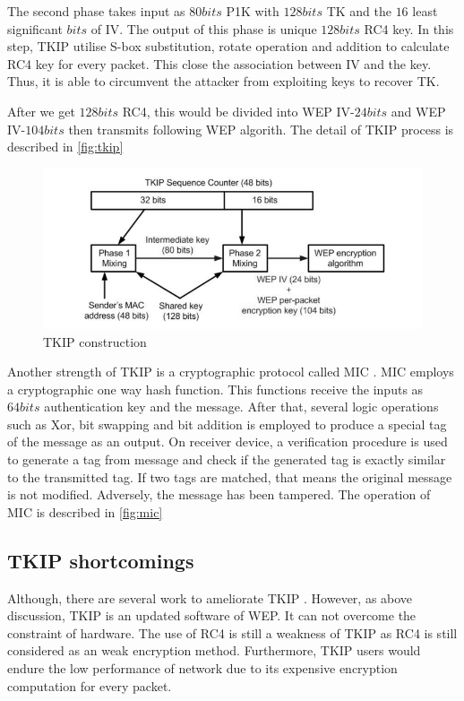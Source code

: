 The second phase takes input as $80 bits$ \ac{P1K} with $128 bits$ \ac{TK} and the $16$ least significant $bits$ of \ac{IV}. The output of this phase is unique $128 bits$ \ac{RC4} key. In this step, \ac{TKIP} utilise S-box substitution, rotate operation and addition to calculate \ac{RC4} key for every packet. This close the association between \ac{IV} and the key. Thus, it is able to circumvent the attacker from exploiting  keys to recover \ac{TK}.

After we get $128 bits$ \ac{RC4}, this would be divided into \ac{WEP} \ac{IV}-$24 bits$ and \ac{WEP} \ac{IV}-$104 bits$ then transmits following \ac{WEP} algorith. The detail of \ac{TKIP} process is described in \autoref{fig:tkip} %

\begin{figure}
	\includegraphics[scale=0.45]{images/tkip.png}
	\caption{\ac{TKIP} construction}
	\label{fig:tkip}
\end{figure}

Another strength of \ac{TKIP} is a cryptographic protocol called \ac{MIC} \cite{1318903}. \ac{MIC} employs a cryptographic one way hash function. This functions receive the inputs as $64 bits$ authentication key and the message. After that, several logic operations such as \ac{Xor}, bit swapping and bit addition is employed to produce a special tag of the message as an output. On receiver device, a verification procedure is used to generate a tag from message and check if the generated tag is exactly similar to the transmitted tag. If two tags are matched, that means the original message is not modified. Adversely, the message has been tampered. The operation of \ac{MIC} is described in \autoref{fig:mic}  %



\subsection{TKIP shortcomings}
Although, there are several work to ameliorate \ac{TKIP} \cite{doomun2012modified}. However, as above discussion, \ac{TKIP} is an updated software of \ac{WEP}. It can not overcome the constraint of hardware. The use of \ac{RC4} is still a weakness of \ac{TKIP} as \ac{RC4} is still considered as an weak encryption method. Furthermore, \ac{TKIP} users would endure the low performance of network due to its expensive encryption computation for every packet. 

